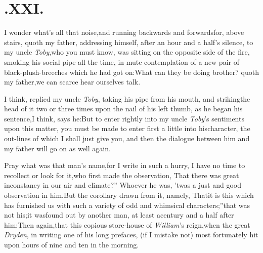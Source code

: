\documentclass{article}
\begin{document}
\section{.\enspace XXI.}

\quad\tsh I wonder what’s
all that noise,\break and running backwards and forwards\break for, above
stairs, quoth my father, addressing himself, after an hour and a\break
half’s silence, to my uncle \textit{Toby},\tsh who
you must know, was sitting on the opposite side of the fire,
smoking his social pipe all the time, in mute contemplation of a
new pair of black-plush-breeches\break
which he had got on:\tsk What
can they be doing brother? quoth my father,\tsk\break we can
scarce hear ourselves talk.

I think, replied my uncle \textit{Toby}, taking his pipe from his
mouth, and striking\break the head of it two or three times upon the nail
of his left thumb, as he began his sentence,\tsh I think,
says he:\tsh\break But to enter rightly into my uncle
\textit{Toby}’s sentiments upon this matter, you must be made
to enter first a little into his\break character, the out-lines of which
I shall just give you, and then the dialogue between
him and my father will go on as well again.

\tsk Pray what was that man’s name,\tsk\break for I write in such a
hurry, I have no time to recollect or look for it,\tsh who
first made the observation, \lqq That there was great
inconstancy in our air and climate?” Whoever he was,
’twas a just and good observation in him.\tsk But the
corollary drawn from it, namely, \lqq That\break it is this which
has furnished us with such a variety of odd and whimsical
characters;”\tsk that was not his;\tsk it was\break found out
by another man, at least a\break century and a half after him:\tsk Then\break
again,\tsk that this copious store-house of 
\textit{William}’s reign,\tsk when the great \textit{Dryden}, in writing one of his
long prefaces, (if I mistake not) most fortunately hit upon\break
{}
hours of nine and ten in the morning.
\end{document}
